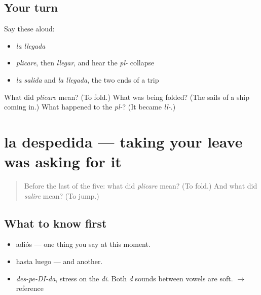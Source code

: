 \subsection*{Your turn}
Say these aloud:

\begin{itemize}
\raggedright
  \item \emph{la llegada}
  \item \emph{plicare}, then \emph{llegar}, and hear the \emph{pl-} collapse
  \item \emph{la salida} and \emph{la llegada}, the two ends of a trip
\end{itemize}

\begin{tcolorbox}[breakable,colback=teal!4,colframe=teal!35!black,title={Before you move on}]
What did \emph{plicare} mean? (To fold.) What was being folded? (The sails of a ship coming in.) What happened to the \emph{pl-}? (It became \emph{ll-}.)
\end{tcolorbox}
\section[la despedida]{la despedida — taking your leave was asking for it}

\label{lesson:ES-C288-despedida}



\begin{quote}
Before the last of the five: what did \emph{plicare} mean? (To fold.) And what did \emph{salire} mean? (To jump.)
\end{quote}

\subsection*{What to know first}
\begin{itemize}
\raggedright
  \item adiós — one thing you say at this moment.
  \item hasta luego — and another.
\end{itemize}

\begin{sounds}
\begin{itemize}
\raggedright
  \item \emph{des-pe-DI-da}, stress on the \emph{di}. Both \emph{d} sounds between vowels are soft. $\to$ reference
\end{itemize}
\end{sounds}

